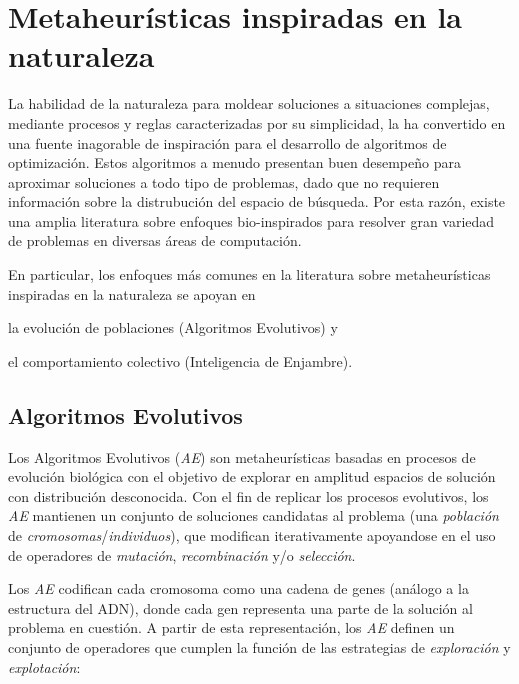 \section{Metaheurísticas inspiradas en la naturaleza}

La habilidad de la naturaleza para moldear soluciones a situaciones complejas, mediante procesos y reglas caracterizadas por su simplicidad, la ha convertido en una fuente inagorable de inspiración para el desarrollo de algoritmos de optimización. Estos algoritmos a menudo presentan buen desempeño para aproximar soluciones a todo tipo de problemas, dado que no requieren información sobre la distrubución del espacio de búsqueda. Por esta razón, existe una amplia literatura sobre enfoques bio-inspirados \cite{binitha2012survey} para resolver gran variedad de problemas en diversas áreas de computación.

En particular, los enfoques más comunes en la literatura sobre metaheurísticas inspiradas en la naturaleza se apoyan en
\begin{inparaenum}
\item la evolución de poblaciones (Algoritmos Evolutivos) y
\item el comportamiento colectivo (Inteligencia de Enjambre).
\end{inparaenum}

\subsection{Algoritmos Evolutivos}

Los Algoritmos Evolutivos (\emph{AE}) son metaheurísticas basadas en procesos de evolución biológica con el objetivo de explorar en amplitud espacios de solución con distribución desconocida. Con el fin de replicar los procesos evolutivos, los \emph{AE} mantienen un conjunto de soluciones candidatas al problema (una \emph{población} de \emph{cromosomas}/\emph{individuos}), que modifican iterativamente apoyandose en el uso de operadores de \emph{mutación}, \emph{recombinación} y/o \emph{selección}.

Los \emph{AE} codifican cada cromosoma como una cadena de genes (análogo a la estructura del ADN), donde cada gen representa una parte de la solución al problema en cuestión. A partir de esta representación, los \emph{AE} definen un conjunto de operadores que cumplen la función de las estrategias de \emph{exploración} y \emph{explotación}:

